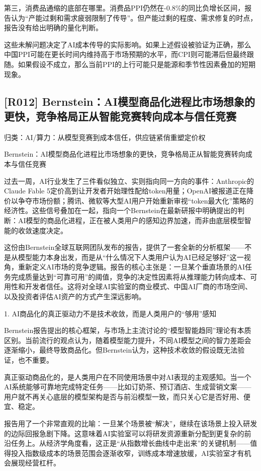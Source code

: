 \documentclass[11pt]{ctexart}
\begin{document}
第三，消费品通缩的底部在哪里。消费品PPI仍然在-0.8\%的同比负增长区间，报告认为“产能过剩和需求疲弱限制了传导”。但产能过剩的程度、需求修复的时点，报告没有给出明确的量化判断。

这些未解问题决定了AI成本传导的实际影响。如果上述假设被验证为正确，那么中国PPI可能在更长时间内维持高于市场预期的水平，而CPI则可能滞后但最终跟随。如果假设不成立，那么当前PPI的上行可能只是能源和季节性因素叠加的短期现象。

\subsection{[R012] Bernstein：AI模型商品化进程比市场想象的更快，竞争格局正从智能竞赛转向成本与信任竞赛}
{\small\color{refgray}归类：AI/算力：从模型竞赛到成本信任，供应链紧俏重塑定价权}

Bernstein：AI模型商品化进程比市场想象的更快，竞争格局正从智能竞赛转向成本与信任竞赛

过去一周，AI行业发生了三件看似独立、实则指向同一方向的事件：Anthropic的Claude Fable 5定价高到让开发者开始理性配给token用量；OpenAI被报道正在降价以争夺市场份额；腾讯、微软等大型AI用户开始重新审视“token最大化”策略的经济性。这些信号叠加在一起，指向一个Bernstein在最新研报中明确提出的判断：AI模型的商品化进程，正在被人类用户的感知边界加速，而非由底层模型智能的收敛速度决定。

这份由Bernstein全球互联网团队发布的报告，提供了一套全新的分析框架——不是从模型能力本身出发，而是从“什么情况下人类用户认为AI已经足够好”这一视角，重新定义AI市场的竞争逻辑。报告的核心主张是：一旦某个垂直场景的AI任务完成质量达到“可靠可用”的阈值，竞争的决定性因素将从推理能力转向成本、可用性和开发者信任。这将对全球AI实验室的商业模式、中国AI厂商的市场空间、以及投资者评估AI资产的方式产生深远影响。

1. AI商品化的真正驱动力不是技术收敛，而是人类用户的“够用”感知

Bernstein报告提出的核心框架，与市场上主流讨论的“模型智能趋同”理论有本质区别。当前流行的观点认为，随着模型能力提升，不同AI模型之间的智力差距会逐渐缩小，最终导致商品化。但Bernstein认为，这种技术收敛的假设既无法验证，也不重要。

真正驱动商品化的，是人类用户在不同使用场景中对AI表现的主观感知。当一个AI系统能够可靠地完成特定任务——比如订奶茶、预订酒店、生成营销文案——用户就不再关心底层的模型架构是否与前沿模型一致，而只关心它是否好用、便宜、稳定。

报告用了一个非常直观的比喻：一旦某个场景被“解决”，继续在该场景上投入研发的边际回报急剧下降。这意味着AI实验室可以将研发资源重新分配到更复杂的前沿任务上。从经济学角度看，这正是“从指数增长曲线中走出来”的关键机制——值得投入指数级成本的场景范围会逐渐收窄，训练成本增速放缓，AI实验室才有机会展现经营杠杆。
\end{document}
